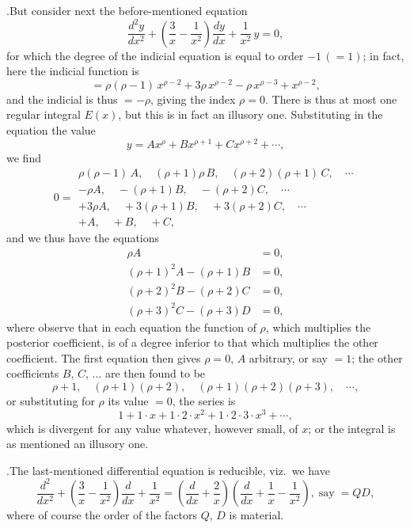 \documentclass[11pt]{article}
\begin{document}
.\quad But consider next the before-mentioned equation
\[
\frac{d^2y}{dx^2} + \left(\frac{3}{x} - \frac{1}{x^2}\right)\frac{dy}{dx} + \frac{1}{x^2}\,y = 0,
\]
for which the degree of the indicial equation is equal to order $-1\,(=1)$; in fact, here the indicial function is
\[
= \rho(\rho-1)\,x^{\rho-2} + 3\rho\,x^{\rho-2} - \rho\,x^{\rho-3} + x^{\rho-2},
\]
and the indicial is thus $= -\rho$, giving the index $\rho=0$. There is thus at most one regular integral $E(x)$, but this is in fact an illusory one. Substituting in the equation the value
\[
y = Ax^{\rho} + Bx^{\rho+1} + Cx^{\rho+2} + \dotsb,
\]
we find
\[
0 = \begin{array}{l} \rho(\rho-1)\,A,\quad (\rho+1)\rho\,B,\quad (\rho+2)(\rho+1)\,C,\quad \dotsb\\ - \rho A,\quad -(\rho+1)B,\quad -(\rho+2)C,\quad \dotsb \\ + 3\rho A,\quad + 3(\rho+1)B,\quad + 3(\rho+2)C,\quad \dotsb \\ + A,\quad + B,\quad + C, \end{array}
\]
and we thus have the equations
\begin{align*}
\rho A &= 0,\\
(\rho+1)^2 A - (\rho+1) B &= 0,\\
(\rho+2)^2 B - (\rho+2) C &= 0,\\
(\rho+3)^2 C - (\rho+3) D &= 0,
\end{align*}
where observe that in each equation the function of $\rho$, which multiplies the posterior coefficient, is of a degree inferior to that which multiplies the other coefficient. The first equation then gives $\rho=0$, $A$ arbitrary, or say $=1$; the other coefficients $B$, $C$, $\dotsc$ are then found to be
\[
\rho+1,\quad (\rho+1)(\rho+2),\quad (\rho+1)(\rho+2)(\rho+3),\quad \dotsb,
\]
or substituting for $\rho$ its value $=0$, the series is
\[
1 + 1\cdot x + 1\cdot 2\cdot x^2 + 1\cdot 2\cdot 3\cdot x^3 + \dotsb,
\]
which is divergent for any value whatever, however small, of $x$; or the integral is as mentioned an illusory one.

\medskip

.\quad The last-mentioned differential equation is reducible, viz.\ we have
\[
\frac{d^2}{dx^2} + \left(\frac{3}{x} - \frac{1}{x^2}\right)\frac{d}{dx} + \frac{1}{x^2} = \left(\frac{d}{dx} + \frac{2}{x}\right)\!\left(\frac{d}{dx} + \frac{1}{x} - \frac{1}{x^2}\right),\;\text{say}\; = QD,
\]
where of course the order of the factors $Q$, $D$ is material.
\end{document}
